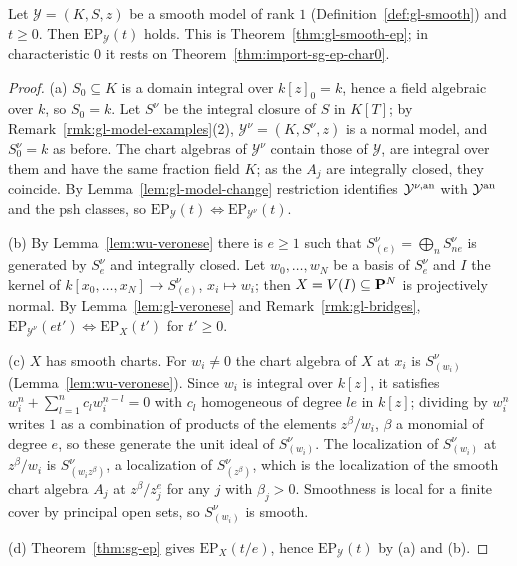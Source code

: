 \begin{corollary}\label{cor:sg-smooth-model}
\leanok
{}
Let $\mathcal Y=(K,S,z)$ be a smooth model of rank $1$ (Definition~\ref{def:gl-smooth}) and $t\ge0$. Then $\mathrm{EP}_{\mathcal Y}(t)$ holds. This is
Theorem~\ref{thm:gl-smooth-ep}; in characteristic $0$ it rests on Theorem~\ref{thm:import-sg-ep-char0}.
\end{corollary}

\begin{proof}
(a) $S_0\subseteq K$ is a domain integral over $k[z]_0=k$, hence a field algebraic over $k$, so $S_0=k$. Let $S^\nu$ be the integral closure of $S$ in
$K[T]$; by Remark~\ref{rmk:gl-model-examples}(2), $\mathcal Y^\nu=(K,S^\nu,z)$ is a normal model, and $S^\nu_0=k$ as before. The chart algebras of
$\mathcal Y^\nu$ contain those of $\mathcal Y$, are integral over them and have the same fraction field $K$; as the $A_j$ are integrally closed, they
coincide. By Lemma~\ref{lem:gl-model-change} restriction identifies $\mathcal Y^{\nu,\mathrm{an}}$ with $\mathcal Y^{\mathrm{an}}$ and the psh classes, so
$\mathrm{EP}_{\mathcal Y}(t)\iff\mathrm{EP}_{\mathcal Y^\nu}(t)$.

(b) By Lemma~\ref{lem:wu-veronese} there is $e\ge1$ such that $S^\nu_{(e)}=\bigoplus_nS^\nu_{ne}$ is generated by $S^\nu_e$ and integrally closed. Let
$w_0,\dots,w_N$ be a basis of $S^\nu_e$ and $I$ the kernel of $k[x_0,\dots,x_N]\to S^\nu_{(e)}$, $x_i\mapsto w_i$; then $X=V(I)\subseteq\mathbf{P}^N$ is projectively
normal. By Lemma~\ref{lem:gl-veronese} and Remark~\ref{rmk:gl-bridges}, $\mathrm{EP}_{\mathcal Y^\nu}(et')\iff\mathrm{EP}_X(t')$ for $t'\ge0$.

(c) $X$ has smooth charts. For $w_i\ne0$ the chart algebra of $X$ at $x_i$ is $S^\nu_{(w_i)}$ (Lemma~\ref{lem:wu-veronese}). Since $w_i$ is integral over
$k[z]$, it satisfies $w_i^n+\sum_{l=1}^nc_lw_i^{n-l}=0$ with $c_l$ homogeneous of degree $le$ in $k[z]$; dividing by $w_i^n$ writes $1$ as a combination of
products of the elements $z^\beta/w_i$, $\beta$ a monomial of degree $e$, so these generate the unit ideal of $S^\nu_{(w_i)}$. The localization
of $S^\nu_{(w_i)}$ at $z^\beta/w_i$ is $S^\nu_{(w_iz^\beta)}$, a localization of $S^\nu_{(z^\beta)}$, which is the localization of the smooth chart algebra $A_j$
at $z^\beta/z_j^e$ for any $j$ with $\beta_j>0$. Smoothness is local for a finite cover by principal open sets, so $S^\nu_{(w_i)}$ is smooth.

(d) Theorem~\ref{thm:sg-ep} gives $\mathrm{EP}_X(t/e)$, hence $\mathrm{EP}_{\mathcal Y}(t)$ by (a) and (b).
\end{proof}

